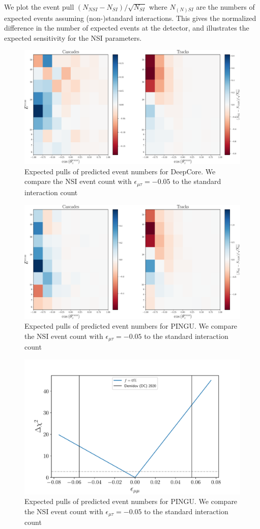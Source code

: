 \documentclass[draft=True]{revtex4-2}
\newcommand{\emt}{\ensuremath{\epsilon_{\mu\tau}}}
\begin{document}
We plot the event pull $(N_{NSI} - N_{SI})/\sqrt{N_{SI}}$ where $N_{(N)SI}$ are the numbers of expected events
assuming (non-)standard interactions. This gives the normalized difference in the
number of expected events at the detector, and illustrates the expected sensitivity for the NSI parameters.

\begin{figure}[!tb]
    \begin{center}
       \includegraphics[width=0.7\linewidth]{figures/DC_event_pulls.pdf}
    \end{center}
    \caption{Expected pulls of predicted event numbers for DeepCore. We compare the NSI event count with $\emt=-0.05$
     to the standard interaction count}\label{fig:DC_event_pulls}
 \end{figure}

 \begin{figure}[!tb]
    \begin{center}
       \includegraphics[width=0.7\linewidth]{figures/PINGU_event_pulls.pdf}
    \end{center}
    \caption{Expected pulls of predicted event numbers for PINGU. We compare the NSI event count with $\emt=-0.05$
    to the standard interaction count}\label{fig:PINGU_event_pulls}
 \end{figure}

 \begin{figure}[!tb]
    \begin{center}
       \includegraphics[width=0.4\linewidth]{figures/PINGU_emm.pdf}
    \end{center}
    \caption{Expected pulls of predicted event numbers for PINGU. We compare the NSI event count with $\emt=-0.05$
    to the standard interaction count}\label{fig:PINGU_chisq}
 \end{figure}
\end{document}
